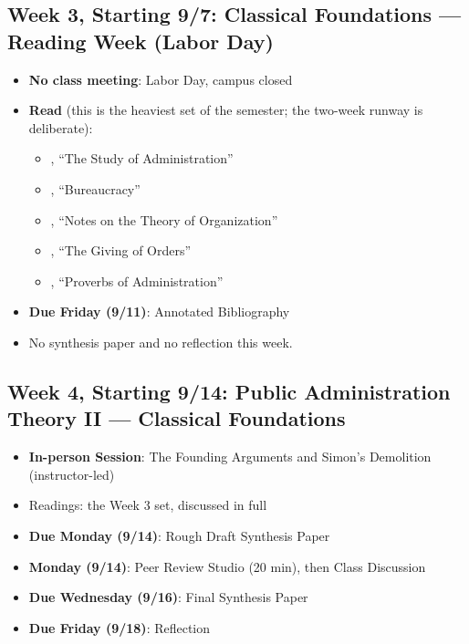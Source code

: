 \documentclass[11pt]{article}     %
\begin{document}
\subsection*{Week 3, Starting 9/7: Classical Foundations --- Reading Week (Labor Day)}
\begin{itemize}
    \item \textbf{No class meeting}: Labor Day, campus closed
    \item \textbf{Read} (this is the heaviest set of the semester; the two-week runway is deliberate):
        \begin{itemize}
            \item \citet{wilson1887}, ``The Study of Administration''
            \item \citet{Weber1946}, ``Bureaucracy''
            \item \citet{gulick1937}, ``Notes on the Theory of Organization''
            \item \citet{Follett1926}, ``The Giving of Orders''
            \item \citet{simon1946}, ``Proverbs of Administration''
        \end{itemize}
    \item \textbf{Due Friday (9/11)}: Annotated Bibliography
    \item No synthesis paper and no reflection this week.
\end{itemize}

\subsection*{Week 4, Starting 9/14: Public Administration Theory II --- Classical Foundations}
\begin{itemize}
    \item \textbf{In-person Session}: The Founding Arguments and Simon's Demolition (instructor-led)
    \item Readings: the Week 3 set, discussed in full
    \item \textbf{Due Monday (9/14)}: Rough Draft Synthesis Paper
    \item \textbf{Monday (9/14)}: Peer Review Studio (20 min), then Class Discussion
    \item \textbf{Due Wednesday (9/16)}: Final Synthesis Paper
    \item \textbf{Due Friday (9/18)}: Reflection
\end{itemize}
\end{document}
